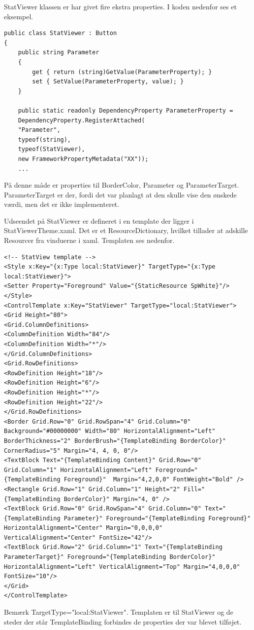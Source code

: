 StatViewer klassen er har givet fire ekstra properties. I koden nedenfor ses et eksempel.
\lstset{style=sharpc}
\begin{lstlisting}
public class StatViewer : Button
{
	public string Parameter
	{
		get { return (string)GetValue(ParameterProperty); }
		set { SetValue(ParameterProperty, value); }
	}
	
	public static readonly DependencyProperty ParameterProperty =
	DependencyProperty.RegisterAttached(
	"Parameter",
	typeof(string),
	typeof(StatViewer),
	new FrameworkPropertyMetadata("XX"));
	...
\end{lstlisting}
På denne måde er properties til BorderColor, Parameter og ParameterTarget. ParameterTarget er der, fordi det var planlagt at den skulle vise den ønskede værdi, men det er ikke implementeret.

Udseendet på StatViewer er defineret i en template der ligger i StatViewerTheme.xaml. Det er et ResourceDictionary, hvilket tillader at adskille Resourcer fra vinduerne i xaml.
Templaten ses nedenfor.
\lstset{style=sharpc}
\begin{lstlisting}
<!-- StatView template -->
<Style x:Key="{x:Type local:StatViewer}" TargetType="{x:Type local:StatViewer}">
<Setter Property="Foreground" Value="{StaticResource SpWhite}"/>
</Style>
<ControlTemplate x:Key="StatViewer" TargetType="local:StatViewer">
<Grid Height="80">
<Grid.ColumnDefinitions>
<ColumnDefinition Width="84"/>
<ColumnDefinition Width="*"/>
</Grid.ColumnDefinitions>
<Grid.RowDefinitions>
<RowDefinition Height="18"/>
<RowDefinition Height="6"/>
<RowDefinition Height="*"/>
<RowDefinition Height="22"/>
</Grid.RowDefinitions>
<Border Grid.Row="0" Grid.RowSpan="4" Grid.Column="0" Background="#00000000" Width="80" HorizontalAlignment="Left" BorderThickness="2" BorderBrush="{TemplateBinding BorderColor}" CornerRadius="5" Margin="4, 4, 0, 0"/>
<TextBlock Text="{TemplateBinding Content}" Grid.Row="0"  Grid.Column="1" HorizontalAlignment="Left" Foreground="{TemplateBinding Foreground}"  Margin="4,2,0,0" FontWeight="Bold" />
<Rectangle Grid.Row="1" Grid.Column="1" Height="2" Fill="{TemplateBinding BorderColor}" Margin="4, 0" />
<TextBlock Grid.Row="0" Grid.RowSpan="4" Grid.Column="0" Text="{TemplateBinding Parameter}" Foreground="{TemplateBinding Foreground}" HorizontalAlignment="Center" Margin="0,0,0,0" VerticalAlignment="Center" FontSize="42"/>
<TextBlock Grid.Row="2" Grid.Column="1" Text="{TemplateBinding ParameterTarget}" Foreground="{TemplateBinding BorderColor}" HorizontalAlignment="Left" VerticalAlignment="Top" Margin="4,0,0,0" FontSize="10"/>
</Grid>
</ControlTemplate>
\end{lstlisting}
Bemærk TargetType="local:StatViewer". Templaten er til StatViewer og de steder der står TemplateBinding forbindes de properties der var blevet tilføjet.
